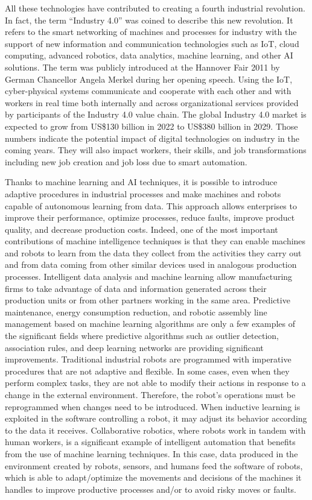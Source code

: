 All these technologies have contributed to creating a fourth industrial revolution. In fact, the term ``Industry 4.0'' was coined to describe this new revolution. It refers to the smart networking of machines and processes for industry with the support of new information and communication technologies such as IoT, cloud computing, advanced robotics, data analytics, machine learning, and other AI solutions. The term was publicly introduced at the Hannover Fair 2011 by German Chancellor Angela Merkel during her opening speech. Using the IoT, cyber-physical systems communicate and cooperate with each other and with workers in real time both internally and across organizational services provided by participants of the Industry 4.0 value chain. The global Industry 4.0 market is expected to grow from US\$130 billion in 2022 to US\$380 billion in 2029. Those numbers indicate the potential impact of digital technologies on industry in the coming years. They will also impact workers, their skills, and job transformations including new job creation and job loss due to smart automation.

Thanks to machine learning and AI techniques, it is possible to introduce adaptive procedures in industrial processes and make machines and robots capable of autonomous learning from data. This approach allows enterprises to improve their performance, optimize processes, reduce faults, improve product quality, and decrease production costs. Indeed, one of the most important contributions of machine intelligence techniques is that they can enable machines and robots to learn from the data they collect from the activities they carry out and from data coming from other similar devices used in analogous production processes. Intelligent data analysis and machine learning allow manufacturing firms to take advantage of data and information generated across their production units or from other partners working in the same area. Predictive maintenance, energy consumption reduction, and robotic assembly line management based on machine learning algorithms are only a few examples of the significant fields where predictive algorithms such as outlier detection, association rules, and deep learning networks are providing significant improvements. Traditional industrial robots are programmed with imperative procedures that are not adaptive and flexible. In some cases, even when they perform complex tasks, they are not able to modify their actions in response to a change in the external environment. Therefore, the robot's operations must be reprogrammed when changes need to be introduced. When inductive learning is exploited in the software controlling a robot, it may adjust its behavior according to the data it receives. Collaborative robotics, where robots work in tandem with human workers, is a significant example of intelligent automation that benefits from the use of machine learning techniques. In this case, data produced in the environment created by robots, sensors, and humans feed the software of robots, which is able to adapt/optimize the movements and \hbox{decisions} of the machines it handles to improve productive processes and/or to avoid risky moves or faults.

